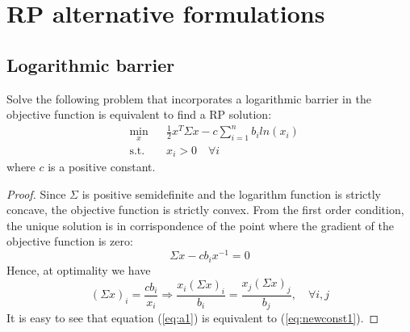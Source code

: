 \section{RP alternative formulations}
\subsection{Logarithmic barrier}\label{sec:rp}
\begin{theorem}
Solve the following problem that incorporates a logarithmic barrier in the objective function is equivalent to find a RP solution:
\begin{equation}\label{eq:log1}
\begin{aligned}
& \underset{x}{\text{min}}
&&\frac{1}{2} x^T \Sigma x - c \sum_{i=1}^{n} b_i ln(x_i)\\
& \text{s.t.}
&& x_i > 0 \hspace{1em} \forall i
\end{aligned}
\end{equation}
where $c$ is a positive constant.
\end{theorem}
\begin{proof}
Since $\Sigma$ is positive semidefinite and the logarithm function is strictly concave, the objective function is strictly convex. From the first order condition, the unique solution is in corrispondence of the point where the gradient of the objective function is zero:
\begin{equation}
\Sigma x - c b_i x^{-1} = 0
\end{equation}
Hence, at optimality we have
\begin{equation}\label{eq:a1}
(\Sigma x)_i = \frac{c b_i}{x_i} \Rightarrow \frac{x_i(\Sigma x)_i}{b_i} = \frac{x_j(\Sigma x)_j}{b_j}, \quad \forall i,j
\end{equation}
It is easy to see that equation (\ref{eq:a1}) is equivalent to (\ref{eq:newconst1}). 
\end{proof}
